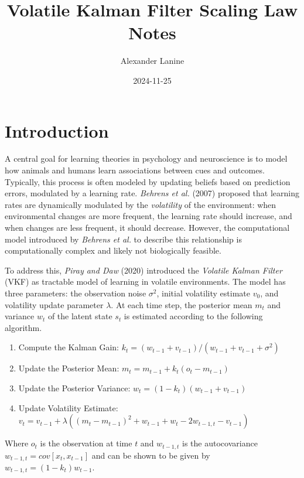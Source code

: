 \documentclass[12pt]{article}
\title{Volatile Kalman Filter Scaling Law Notes}
\author{Alexander Lanine}
\date{2024-11-25}
\theoremstyle{definition}
\begin{document}
\maketitle

\section*{Introduction}

A central goal for learning theories in psychology and neuroscience is to model how animals and humans learn associations between cues and outcomes. 
Typically, this process is often modeled by updating beliefs based on prediction errors, modulated by a learning rate. 
\textit{Behrens et al.} (2007) proposed that learning rates are dynamically modulated by the \textit{volatility} of the environment: when environmental changes are more frequent, the learning rate should increase, and when changes are less frequent, it should decrease. 
However, the computational model introduced by \textit{Behrens et al.} to describe this relationship is computationally complex and likely not biologically feasible.

To address this, \textit{Piray and Daw} (2020) introduced the \textit{Volatile Kalman Filter} (VKF) as tractable model of learning in volatile environments.
The model has three parameters: the observation noise $\sigma^2$, initial volatility estimate $v_0$, and volatility update parameter $\lambda$. 
At each time step, the posterior mean $m_t$ and variance $w_t$ of the latent state $s_t$ is estimated according to the following algorithm.

\begin{enumerate}
    \item Compute the Kalman Gain: 
    $k_t = (w_{t-1}+v_{t-1})/(w_{t-1}+v_{t-1}+\sigma^2)$

    \item Update the Posterior Mean:
    $m_t = m_{t-1} + k_t(o_t-m_{t-1})$

    \item Update the Posterior Variance: 
    $w_t = (1-k_t)(w_{t-1}+v_{t-1})$

    \item Update Volatility Estimate: 
    $v_t = v_{t-1} + \lambda
        ((m_t-m_{t-1})^2+w_{t-1}+w_t-2w_{t-1,t}-v_{t-1})$
\end{enumerate}
Where $o_t$ is the observation at time $t$ and $w_{t-1,t}$ is the autocovariance $w_{t-1,t} = cov[x_t,x_{t-1}]$ and can be shown to be given by 
$w_{t-1,t} = (1-k_t)w_{t-1}.$
\end{document}
